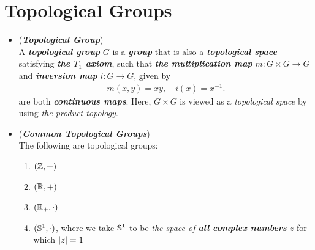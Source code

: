\documentclass[11pt]{article}
\begin{document}
\section{Topological Groups}
\begin{itemize}
\item \begin{definition} (\emph{\textbf{Topological Group}})\\
A \underline{\emph{\textbf{topological group}}} $G$ is a \emph{\textbf{group}} that is also a \emph{\textbf{topological space}} satisfying \emph{\textbf{the $T_1$ axiom}}, such that  \emph{\textbf{the multiplication map}} $m: G \times G \rightarrow G$ and \emph{\textbf{inversion map}} $i: G \rightarrow G$, given by
\begin{align*}
m(x, y) = x y, \quad i(x) = x^{-1}.
\end{align*} are both \emph{\textbf{continuous maps}}. Here, $G\times G$ is viewed as a \emph{topological space} by using \emph{the product topology}.
\end{definition}

\item \begin{example} (\emph{\textbf{Common Topological Groups}})\\
The following are topological groups:
\begin{enumerate}
\item $({\mathbb Z}, +)$
\item $({\mathbb R}, +)$
\item $({\mathbb R}_{+}, \cdot)$
\item $({\mathbb S}^1, \cdot)$, where we take ${\mathbb S}^1$ to be \emph{the space of \textbf{all complex numbers} $z$} for which $\left\lvert z \right\rvert = 1$
\end{enumerate}
\end{example}


\end{itemize}
\end{document}
